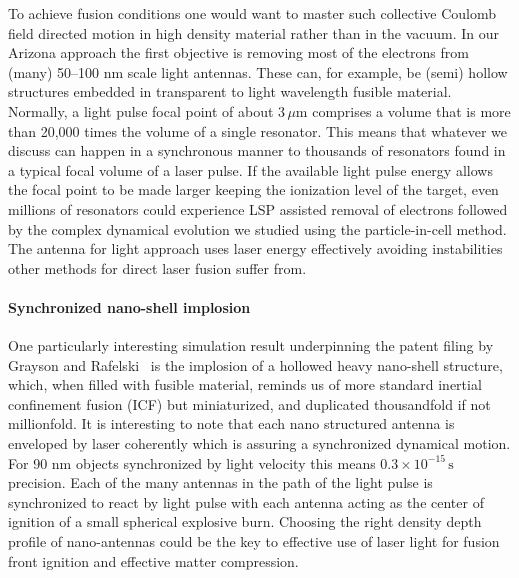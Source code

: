 \documentclass[particles,article,accept,pdftex,moreauthors]{Definitions/mdpi}
\begin{document}
To achieve fusion conditions one would want to master such collective Coulomb field directed motion in high density material rather than in the vacuum. In our Arizona approach the first objective is removing most of the electrons from (many) 50--100 nm scale light antennas. These can, for example, be (semi) hollow structures embedded in transparent to light wavelength fusible material. Normally, a light pulse focal point of about 3\,$\mu $m comprises a volume that is more than 20,000 times the volume of a single resonator. This means that whatever we discuss can happen in a synchronous manner to thousands of resonators found in a typical focal volume of a laser pulse. If the available light pulse energy allows the focal point to be made larger keeping the ionization level of the target, even millions of resonators could experience LSP assisted removal of electrons followed by the complex dynamical evolution we studied using the particle-in-cell method. The antenna for light approach uses laser energy effectively avoiding instabilities other methods for direct laser fusion suffer from. 

\paragraph*{\bf Synchronized nano-shell implosion}
One particularly interesting simulation result underpinning the patent filing by Grayson and Rafelski~\cite{ChGJR2025patent} is the implosion of a hollowed heavy nano-shell structure, which, when filled with fusible material, reminds us of more standard inertial confinement fusion (ICF) but miniaturized, and duplicated thousandfold if not millionfold. It is interesting to note that each nano structured antenna is enveloped by laser coherently which is assuring a synchronized dynamical motion. For 90 nm objects synchronized by light velocity this means $ 0.3\times 10^{-15}\,\mathrm{s}$ precision. Each of the many antennas in the path of the light pulse is synchronized to react by light pulse with each antenna acting as the center of ignition of a small spherical explosive burn. Choosing the right density depth profile of nano-antennas could be the key to effective use of laser light for fusion front ignition and effective matter compression.
\end{document}
